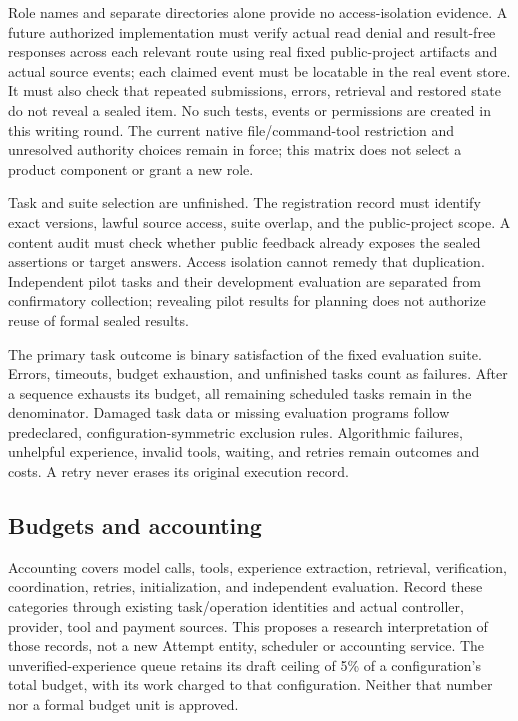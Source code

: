 \documentclass[
  english,
  11pt,
]{article}
\begin{document}
Role names and separate directories alone provide no access-isolation
evidence. A future authorized implementation must verify actual read
denial and result-free responses across each relevant route using real
fixed public-project artifacts and actual source events; each claimed
event must be locatable in the real event store. It must also check that
repeated submissions, errors, retrieval and restored state do not reveal
a sealed item. No such tests, events or permissions are created in this
writing round. The current native file/command-tool restriction and
unresolved authority choices remain in force; this matrix does not
select a product component or grant a new role.

Task and suite selection are unfinished. The registration record must
identify exact versions, lawful source access, suite overlap, and the
public-project scope. A content audit must check whether public feedback
already exposes the sealed assertions or target answers. Access
isolation cannot remedy that duplication. Independent pilot tasks and
their development evaluation are separated from confirmatory collection;
revealing pilot results for planning does not authorize reuse of formal
sealed results.

The primary task outcome is binary satisfaction of the fixed evaluation
suite. Errors, timeouts, budget exhaustion, and unfinished tasks count
as failures. After a sequence exhausts its budget, all remaining
scheduled tasks remain in the denominator. Damaged task data or missing
evaluation programs follow predeclared, configuration-symmetric
exclusion rules. Algorithmic failures, unhelpful experience, invalid
tools, waiting, and retries remain outcomes and costs. A retry never
erases its original execution record.

\subsection{Budgets and accounting}\label{budgets-and-accounting}

Accounting covers model calls, tools, experience extraction, retrieval,
verification, coordination, retries, initialization, and independent
evaluation. Record these categories through existing task/operation
identities and actual controller, provider, tool and payment sources.
This proposes a research interpretation of those records, not a new
Attempt entity, scheduler or accounting service. The
unverified-experience queue retains its draft ceiling of 5\% of a
configuration's total budget, with its work charged to that
configuration. Neither that number nor a formal budget unit is approved.
\end{document}
